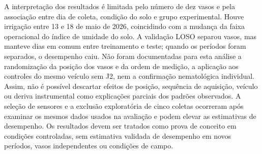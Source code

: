 
A interpretação dos resultados é limitada pelo número de dez vasos e pela
associação entre dia de coleta, condição do solo e grupo experimental.
Houve irrigação entre 13 e 18 de maio de 2026, coincidindo com a mudança
da faixa operacional do índice de umidade do solo. A validação LOSO
separou vasos, mas manteve dias em comum entre treinamento e teste;
quando os períodos foram separados, o desempenho caiu. Não foram
documentadas para esta análise a randomização da posição dos vasos e da
ordem de medição, a aplicação aos controles do mesmo veículo sem J2,
nem a confirmação nematológica individual. Assim, não é possível
descartar efeitos de posição, sequência de aquisição, veículo ou deriva
instrumental como explicações parciais dos padrões observados. A seleção
de sensores e a exclusão exploratória de cinco coletas ocorreram após
examinar os mesmos dados usados na avaliação e podem elevar as estimativas
de desempenho. Os resultados devem ser tratados como prova de conceito
em condições controladas, sem estimativa validada de desempenho em novos
períodos, vasos independentes ou condições de campo.
